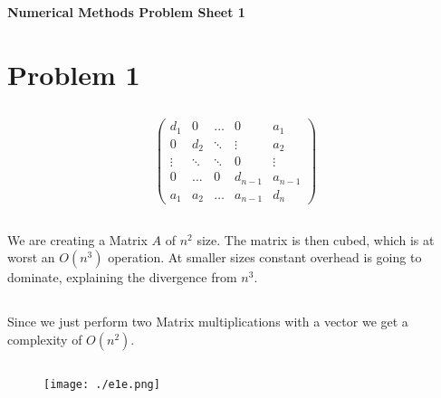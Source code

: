 \newcommand{\doctitle}{Numerical Methods Problem Sheet 1}



\begin{center}{\bfseries\Huge\doctitle}\end{center}

\section{Problem 1}
\subsection{}

$$ \left(\begin{array}{ccccc}
     d_1 & 0 & \hdots & 0 & a_1 \\
     0 & d_2 & \ddots & \vdots & a_2 \\
     \vdots & \ddots & \ddots & 0 & \vdots \\
     0 & \hdots & 0 & d_{n-1} & a_{n-1} \\
     a_1 & a_2 & \hdots & a_{n-1} & d_n
\end{array}\right) $$

\subsection{}

We are creating a Matrix $A$ of $n^2$ size. The matrix is then cubed, which is at worst an $O(n^3)$ operation. At smaller sizes constant overhead is going to dominate, explaining the divergence from $n^3$.

\subsection{}


\subsection{}

Since we just perform two Matrix multiplications with a vector we get a complexity of $O(n^2)$.

\subsection{}

\begin{figure}[h!]
  \texttt{[image: ./e1e.png]}
\end{figure}

\subsection{}




